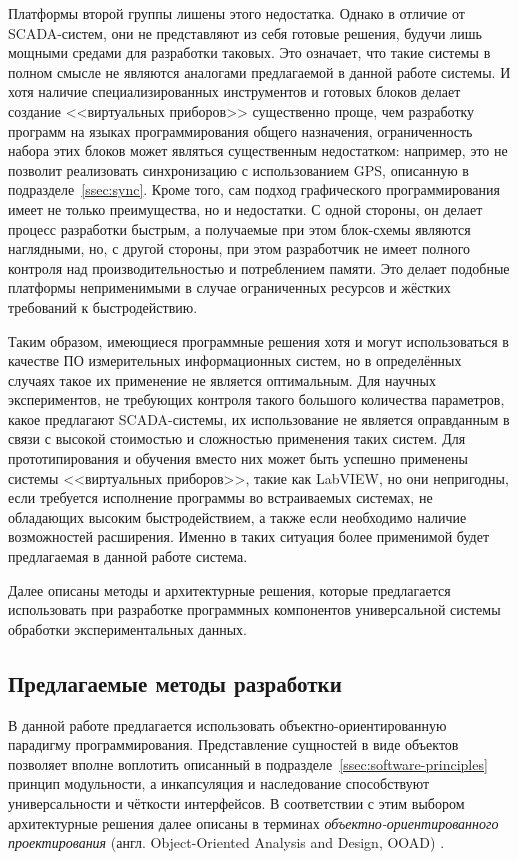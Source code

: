 \documentclass[a4paper, 14pt, titlepage]{extarticle}
\newcommand{\eng}[1]{\foreignlanguage{english}{#1}}
\newcommand{\term}[1]{\emph{#1}}
\begin{document}
  Платформы второй группы лишены этого недостатка. Однако в отличие от SCADA-систем, они не
  представляют из себя готовые решения, будучи лишь мощными средами для разработки таковых.
  Это означает, что такие системы в полном смысле не являются аналогами предлагаемой в данной работе системы.
  И хотя наличие специализированных инструментов и готовых блоков делает создание <<виртуальных приборов>> существенно
  проще, чем разработку программ на языках программирования общего назначения, ограниченность набора этих блоков
  может являться существенным недостатком: например, это не позволит реализовать синхронизацию с
  использованием GPS, описанную в подразделе~\ref{ssec:sync}.
  Кроме того, сам подход графического программирования имеет не только преимущества, но и
  недостатки. С одной стороны, он делает процесс разработки быстрым, а получаемые при этом
  блок-схемы являются наглядными, но, с другой стороны, при этом разработчик не имеет полного контроля над
  производительностью и потреблением памяти. Это делает подобные платформы неприменимыми в случае
  ограниченных ресурсов и жёстких требований к быстродействию.

  Таким образом, имеющиеся программные решения хотя и могут использоваться в качестве ПО
  измерительных информационных систем, но в определённых случаях такое их применение не является
  оптимальным.  Для научных экспериментов, не требующих контроля такого большого количества
  параметров, какое предлагают SCADA-системы, их использование не является оправданным в связи с высокой
  стоимостью и сложностью применения таких систем. Для прототипирования и обучения вместо них может
  быть успешно применены системы <<виртуальных приборов>>, такие как LabVIEW, но они непригодны,
  если требуется исполнение программы во встраиваемых системах, не обладающих высоким
  быстродействием, а также если необходимо наличие возможностей расширения. Именно в таких ситуация более
  применимой будет предлагаемая в данной работе система.

  Далее описаны методы и архитектурные решения, которые предлагается использовать при разработке программных
  компонентов универсальной системы обработки экспериментальных данных.

  \subsection{Предлагаемые методы разработки}\label{ssec:methods}

  В данной работе предлагается использовать объектно-ориентированную парадигму программирования.
  Представление сущностей в виде объектов позволяет вполне воплотить описанный в подразделе~\ref{ssec:software-principles}
  принцип модульности, а инкапсуляция и наследование способствуют универсальности и чёткости интерфейсов.
  В соответствии с этим выбором архитектурные решения далее описаны в терминах \term{объектно-ориентированного
  проектирования} (англ. \eng{Object-Oriented Analysis and Design, OOAD}) \cite{booch-ooad}.
\end{document}
